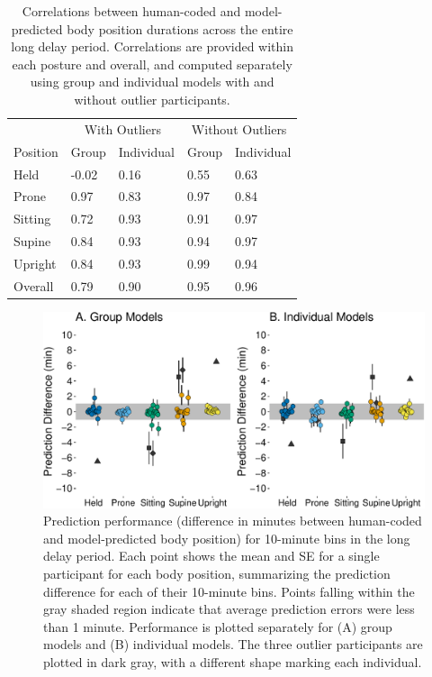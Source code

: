 \documentclass[
  man]{apa6}
\begin{document}
\begin{table}[tbp]

\begin{center}
\begin{threeparttable}

\caption{\label{tab:pt2overalltable}Correlations between human-coded and model-predicted body position durations across the entire long delay period. Correlations are provided within each posture and overall, and computed separately using group and individual models with and without outlier participants.}

\begin{tabular}{lllll}
\toprule
 & \multicolumn{2}{c}{With Outliers} & \multicolumn{2}{c}{Without Outliers} \\
\cmidrule(r){2-3} \cmidrule(r){4-5}
Position & Group & Individual & Group & Individual\\
\midrule
Held & -0.02 & 0.16 & 0.55 & 0.63\\
Prone & 0.97 & 0.83 & 0.97 & 0.84\\
Sitting & 0.72 & 0.93 & 0.91 & 0.97\\
Supine & 0.84 & 0.93 & 0.94 & 0.97\\
Upright & 0.84 & 0.93 & 0.99 & 0.94\\ \midrule
Overall & 0.79 & 0.90 & 0.95 & 0.96\\
\bottomrule
\end{tabular}

\end{threeparttable}
\end{center}

\end{table}

\begin{figure}

{\centering \includegraphics{manuscript_files/figure-latex/part2bins-1} 

}

\caption{Prediction performance (difference in minutes between human-coded and model-predicted body position) for 10-minute bins in the long delay period. Each point shows the mean and SE for a single participant for each body position, summarizing the prediction difference for each of their 10-minute bins. Points falling within the gray shaded region indicate that average prediction errors were less than 1 minute. Performance is plotted separately for (A) group models and (B) individual models. The three outlier participants are plotted in dark gray, with a different shape marking each individual.}\label{fig:part2bins}
\end{figure}
\end{document}
